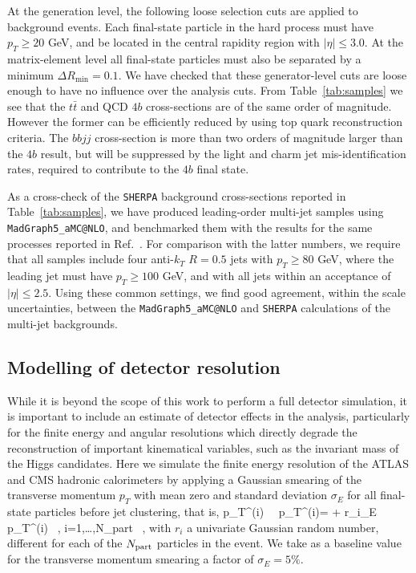 At the generation level, the following loose selection 
cuts are applied to
background events.
%
Each final-state particle in the hard process must have $p_T \ge 20$ GeV, and be located
in the central  rapidity
region with
$| \eta | \le 3.0$.
%
At the matrix-element level
all final-state particles must also be separated by a minimum $\Delta R_{\mathrm{min}} =0.1$.
%
We have checked that these generator-level cuts are loose enough to have
no influence over the analysis cuts.
%
From Table~\ref{tab:samples}
we see that the $t\bar{t}$ and QCD $4b$ cross-sections are of
the same order of magnitude. However the former can be efficiently
reduced by using top quark reconstruction criteria.
%
The $bbjj$ cross-section is more than two orders
of magnitude larger than the $4b$ result, but will be suppressed
by the light and charm jet mis-identification rates,
required to contribute to the $4b$ final state.

 
 


As a cross-check of the {\tt SHERPA}
background cross-sections reported in Table~\ref{tab:samples}, we have produced leading-order
multi-jet samples
using {\tt MadGraph5\_aMC@NLO}, and
benchmarked them with the results for the same processes reported in
Ref.~\cite{Alwall:2014hca}.
%
For comparison with the latter numbers, 
we require that all samples include four anti-$k_T$ $R=0.5$ jets with $p_T \ge 80 $ GeV, where the leading jet must have $p_T \ge 100$ GeV, and with all jets within an acceptance of $|\eta| \le 2.5 $.
%
Using these common settings,
we find good agreement,
within the scale uncertainties, between the
{\tt MadGraph5\_aMC@NLO} and {\tt SHERPA} calculations of the multi-jet
backgrounds.


\subsection{Modelling of detector resolution}
\label{sec:detectormodeling}

While it is beyond the scope of this work to perform a full
detector simulation, it is important to include an estimate of detector
effects in the analysis, particularly for the finite energy
and angular resolutions which directly
degrade the reconstruction of important kinematical variables, such as
the invariant mass of the Higgs candidates.
%
Here we simulate the finite energy resolution of the ATLAS and CMS
hadronic calorimeters by applying a Gaussian smearing of the transverse
momentum $p_T$ with mean zero and standard deviation $\sigma_E$ for all
final-state particles before jet clustering, that is,
%
\be
\label{eq:smearing}
p_T^{(i)} \, \to \, p_T^{(i)\prime}= + r_i\cdot\sigma_E \rp\, p_T^{(i)} \, , \quad
i=1,\ldots,N_{\rm part} \, ,
\ee
with $r_i$ a univariate Gaussian random number, different for each
of the $N_{\rm part}$ particles in the event.
%
We take as a baseline value for the transverse momentum smearing a
factor of $\sigma_E=5\%$.
%

